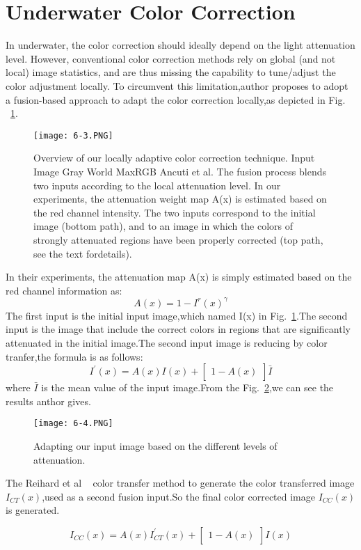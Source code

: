 \documentclass[10pt,twocolumn,letterpaper]{article}
\begin{document}
\section{Underwater Color Correction}
In underwater, the color correction should ideally depend on the light attenuation level. However, conventional color correction methods rely on global (and not local) image statistics, and are thus missing the capability to tune/adjust
the color adjustment locally. To circumvent this limitation,author proposes to adopt a fusion-based approach to adapt the color correction locally,as depicted in Fig. ~\ref{fig:figure1}.\par
\begin{figure}[htb]
\centering
\texttt{[image: 6-3.PNG]}
\caption{Overview of our locally adaptive color correction technique.
Input Image Gray World MaxRGB Ancuti et al. The fusion process blends two inputs according to the local attenuation level. In our experiments, the attenuation weight map A(x) is estimated based on the red channel intensity. The two inputs correspond to the initial image (bottom path), and to an image in which the colors of strongly attenuated regions have been properly corrected (top path, see the text fordetails).}
\label{fig:figure1}
\end{figure}
In their experiments, the attenuation map A(x) is simply estimated based on the red channel information as:
\begin{equation}
A(x) = 1-I^{r}(x)^{\gamma}
\end{equation}
The first input is the initial input image,which named I(x) in Fig.~\ref{fig:figure1}.The second input is the image that include the correct colors in regions that are significantly attenuated in the initial image.The second input image is reducing by color tranfer,the formula is as follows:
\begin{equation}
I^{'}(x) = A(x)I(x) + \begin{bmatrix}
1-A(x)
\end{bmatrix}\bar{I}
\end{equation}
where $\bar{I}$ is the mean value of the input image.From the Fig.~\ref{fig:figure2},we can see the results anthor gives.
\begin{figure}[htb]
\centering
\texttt{[image: 6-4.PNG]}
\caption{Adapting our input image based on the different levels of attenuation.}
\label{fig:figure2}
\end{figure}

The Reihard et al ~\cite{transfer2001_1} color transfer method to generate the color transferred image $I_{CT}(x)$,used as a second fusion input.So the final color corrected image $I_{CC}(x)$ is generated.\par
\begin{equation}
I_{CC}(x) = A(x)I^{'}_{CT}(x) + \begin{bmatrix}
1-A(x)
\end{bmatrix}I(x)
\end{equation}
\end{document}
